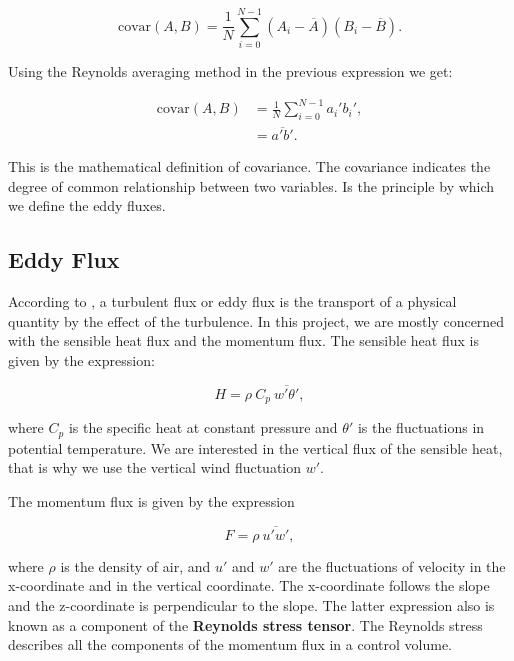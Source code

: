 \documentclass[a4paper,12pt]{article}
\begin{document}
\begin{equation}
    \text{covar}(A,B) = \frac{1}{N}\sum_{i=0}^{N-1} (A_i - \overline{A})(B_i - \overline{B}).
\end{equation}

\noindent Using the Reynolds averaging method in the previous expression we get:

\begin{subequations}
\begin{align}
    \text{covar}(A,B) &= \frac{1}{N}\sum_{i=0}^{N-1} a_i' b_i', \\
    &= \overline{a'b'}.
\end{align}
\end{subequations}

\noindent This is the mathematical definition of covariance. The covariance indicates the degree of common relationship between two variables. Is the principle by which we define the eddy fluxes.

\subsection{Eddy Flux}
According to \cite{stull2012introduction}, a turbulent flux or eddy flux is the transport of a physical quantity by the effect of the turbulence. In this project, we are mostly concerned with the sensible heat flux and the momentum flux. The sensible heat flux is given by the expression:

\begin{equation}
    H = \rho \ C_p \ \overline{w'\theta'},
\end{equation}

\noindent where $C_p$ is the specific heat at constant pressure and $\theta '$ is the fluctuations in potential temperature. We are interested in the vertical flux of the sensible heat, that is why we use the vertical wind fluctuation $w'$.

The momentum flux is given by the expression

\begin{equation}
    F = \rho \ \overline{u'w'}, 
\end{equation}

\noindent where $\rho$ is the density of air, and $u'$ and $w'$ are the fluctuations of velocity in the x-coordinate and in the vertical coordinate. The x-coordinate follows the slope and the z-coordinate is perpendicular to the slope. The latter expression also is known as a component of the \textbf{Reynolds stress tensor}. The Reynolds stress describes all the components of the momentum flux in a control volume.
\end{document}
